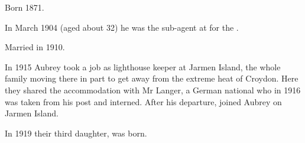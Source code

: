 
Born 1871.

In March 1904 (aged about 32) he was the sub-agent at  for the .\cite{1904AubreyAgent}
 
Married  in 1910.\cite{HAHmarriage}

In 1915 Aubrey took a job as lighthouse keeper at Jarmen Island,
the whole family moving there in part to get away from the extreme heat of Croydon.\cite{Connie1983}
Here they shared the accommodation with Mr Langer,
a German national who in 1916 was taken from his post and interned.\cite{Connie1983}
After his departure,  joined Aubrey on Jarmen Island.

In 1919 their third daughter,  was born.
